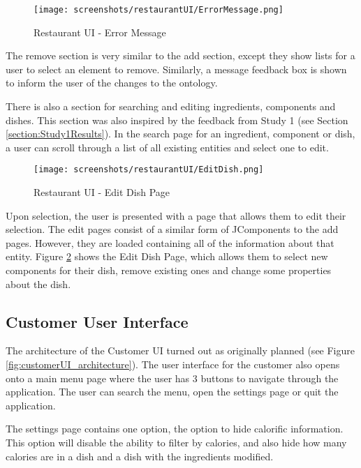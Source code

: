 \begin{figure}[h]
    \centering
    \captionsetup{justification=centering}
    \texttt{[image: screenshots/restaurantUI/ErrorMessage.png]}
    \caption{Restaurant UI - Error Message}
    \label{fig:restaurantUI_error}
\end{figure}

The remove section is very similar to the add section, except they show lists for a user to select an element to remove. Similarly, a message feedback box is shown to inform the user of the changes to the ontology.

There is also a section for searching and editing ingredients, components and dishes. This section was also inspired by the feedback from Study 1 (see Section \ref{section:Study1Results}). In the search page for an ingredient, component or dish, a user can scroll through a list of all existing entities and select one to edit.

\begin{figure}[h]
    \centering
    \captionsetup{justification=centering}
    \texttt{[image: screenshots/restaurantUI/EditDish.png]}
    \caption{Restaurant UI - Edit Dish Page}
    \label{fig:restaurantUI_edit_dish}
\end{figure}

Upon selection, the user is presented with a page that allows them to edit their selection. The edit pages consist of a similar form of JComponents to the add pages. However, they are loaded containing all of the information about that entity. Figure \ref{fig:restaurantUI_edit_dish} shows the Edit Dish Page, which allows them to select new components for their dish, remove existing ones and change some properties about the dish.

\subsection{Customer User Interface}

The architecture of the Customer UI turned out as originally planned (see Figure \ref{fig:customerUI_architecture}). The user interface for the customer also opens onto a main menu page where the user has 3 buttons to navigate through the application. The user can search the menu, open the settings page or quit the application.

The settings page contains one option, the option to hide calorific information. This option will disable the ability to filter by calories, and also hide how many calories are in a dish and a dish with the ingredients modified.

